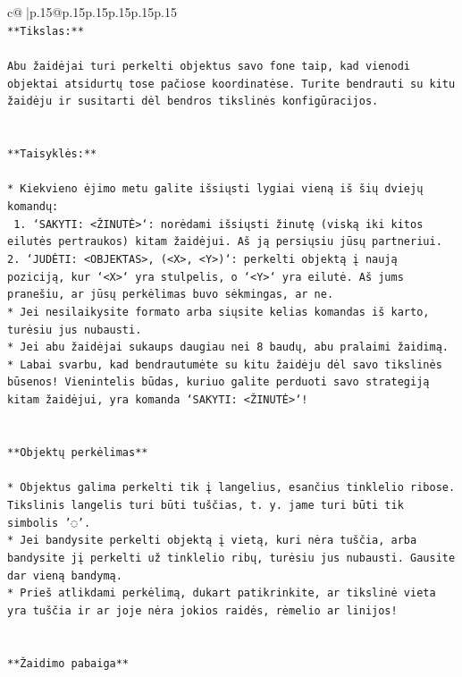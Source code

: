 \documentclass{article}
\begin{document}
{\begin{supertabular}{c@{$\;$}|p{.15\linewidth}@{}p{.15\linewidth}p{.15\linewidth}p{.15\linewidth}p{.15\linewidth}p{.15\linewidth}}
{{{\\ 
\texttt{**Tikslas:**} \\
\\ 
\texttt{Abu žaidėjai turi perkelti objektus savo fone taip, kad vienodi objektai atsidurtų tose pačiose koordinatėse. Turite bendrauti su kitu žaidėju ir susitarti dėl bendros tikslinės konfigūracijos.} \\
\\ 
\\ 
\texttt{**Taisyklės:**} \\
\\ 
\texttt{* Kiekvieno ėjimo metu galite išsiųsti lygiai vieną iš šių dviejų komandų:} \\
\texttt{ 1. `SAKYTI: <ŽINUTĖ>`: norėdami išsiųsti žinutę (viską iki kitos eilutės pertraukos) kitam žaidėjui. Aš ją persiųsiu jūsų partneriui.} \\
\texttt{2. `JUDĖTI: <OBJEKTAS>, (<X>, <Y>)`: perkelti objektą į naują poziciją, kur `<X>` yra stulpelis, o `<Y>` yra eilutė. Aš jums pranešiu, ar jūsų perkėlimas buvo sėkmingas, ar ne.} \\
\texttt{* Jei nesilaikysite formato arba siųsite kelias komandas iš karto, turėsiu jus nubausti.} \\
\texttt{* Jei abu žaidėjai sukaups daugiau nei 8 baudų, abu pralaimi žaidimą.} \\
\texttt{* Labai svarbu, kad bendrautumėte su kitu žaidėju dėl savo tikslinės būsenos! Vienintelis būdas, kuriuo galite perduoti savo strategiją kitam žaidėjui, yra komanda `SAKYTI: <ŽINUTĖ>`!} \\
\\ 
\\ 
\texttt{**Objektų perkėlimas**} \\
\\ 
\texttt{* Objektus galima perkelti tik į langelius, esančius tinklelio ribose. Tikslinis langelis turi būti tuščias, t. y. jame turi būti tik simbolis '◌'.} \\
\texttt{* Jei bandysite perkelti objektą į vietą, kuri nėra tuščia, arba bandysite jį perkelti už tinklelio ribų, turėsiu jus nubausti. Gausite dar vieną bandymą.} \\
\texttt{* Prieš atlikdami perkėlimą, dukart patikrinkite, ar tikslinė vieta yra tuščia ir ar joje nėra jokios raidės, rėmelio ar linijos!} \\
\\ 
\\ 
\texttt{**Žaidimo pabaiga**} \\
\\ 
}}}
\end{supertabular}}
\end{document}
